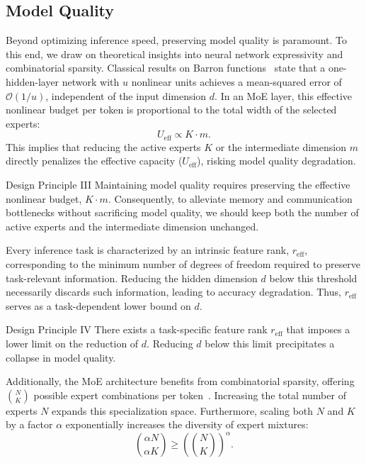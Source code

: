 \subsection{Model Quality}
Beyond optimizing inference speed, preserving model quality is paramount. To this end, we draw on theoretical insights into neural network expressivity and combinatorial sparsity.
Classical results on Barron functions~\citep{barron1993} state that a one-hidden-layer network with $u$ nonlinear units achieves a mean-squared error of $\mathcal{O}(1/u)$, independent of the input dimension $d$. In an MoE layer, this effective nonlinear budget per token is proportional to the total width of the selected experts:
\begin{equation*}
U_{\mathrm{eff}} \propto K \cdot m.
\end{equation*}
This implies that reducing the active experts $K$ or the intermediate dimension $m$ directly penalizes the effective capacity ($U_{\mathrm{eff}}$), risking model quality degradation.

\begin{notebox}{Design Principle III}
Maintaining model quality requires preserving the effective nonlinear budget, $K \cdot m$. Consequently, to alleviate memory and communication bottlenecks without sacrificing model quality, we should keep both the number of active experts and the intermediate dimension unchanged.
\end{notebox}

Every inference task is characterized by an intrinsic feature rank, $r_\mathrm{eff}$, corresponding to the minimum number of degrees of freedom required to preserve task-relevant information. Reducing the hidden dimension $d$ below this threshold necessarily discards such information, leading to accuracy degradation. Thus, $r_\mathrm{eff}$ serves as a task-dependent lower bound on $d$.

\begin{notebox}{Design Principle IV}
There exists a task-specific feature rank $r_\mathrm{eff}$ that imposes a lower limit on the reduction of $d$. Reducing $d$ below this limit precipitates a collapse in model quality.
\end{notebox}

Additionally, the MoE architecture benefits from combinatorial sparsity, offering $\binom{N}{K}$ possible expert combinations per token~\citep{deepseekmoe}. Increasing the total number of experts $N$ expands this specialization space. Furthermore, scaling both $N$ and $K$ by a factor $\alpha$ exponentially increases the diversity of expert mixtures:
\begin{equation*}
    \binom{\alpha N}{\alpha K} \ge \left( \binom{N}{K} \right)^\alpha.
\end{equation*}

